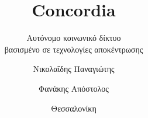 \title{Concordia}
\subtitle{Αυτόνομο κοινωνικό δίκτυο\\βασισμένο σε τεχνολογίες αποκέντρωσης}


\newcommand{\keyword}[1]{\textbf{\textcolor{concordia}{#1}}}

\author{Νικολαΐδης Παναγιώτης \and Φανάκης Απόστολος}


\date{Θεσσαλονίκη \the\year}